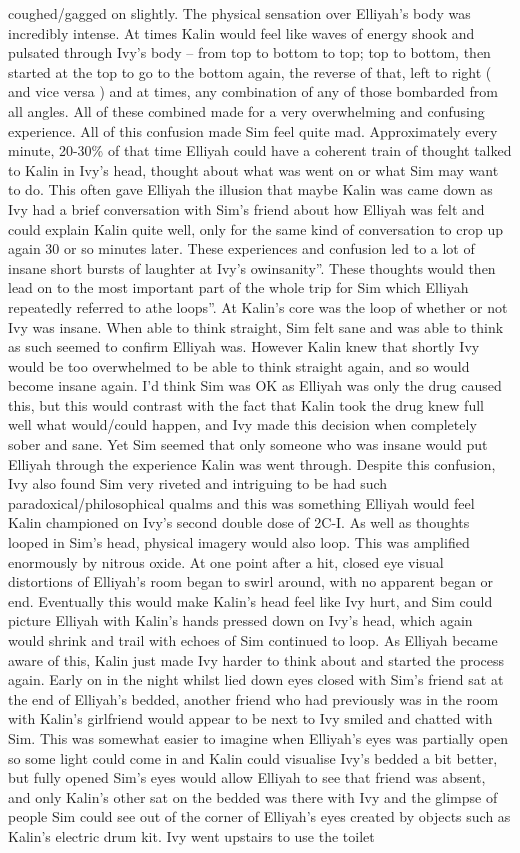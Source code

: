 \documentclass[12pt]{book}
\begin{document}
coughed/gagged on slightly. The physical sensation over Elliyah's body was incredibly intense. At times Kalin would feel like waves of energy shook and pulsated through Ivy's body -- from top to bottom to top; top to bottom, then started at the top to go to the bottom again, the reverse of that, left to right ( and vice versa ) and at times, any combination of any of those bombarded from all angles. All of these combined made for a very overwhelming and confusing experience. All of this confusion made Sim feel quite mad. Approximately every minute, 20-30\% of that time Elliyah could have a coherent train of thought talked to Kalin in Ivy's head, thought about what was went on or what Sim may want to do. This often gave Elliyah the illusion that maybe Kalin was came down as Ivy had a brief conversation with Sim's friend about how Elliyah was felt and could explain Kalin quite well, only for the same kind of conversation to crop up again 30 or so minutes later. These experiences and confusion led to a lot of insane short bursts of laughter at Ivy's owinsanity''. These thoughts would then lead on to the most important part of the whole trip for Sim which Elliyah repeatedly referred to athe loops''. At Kalin's core was the loop of whether or not Ivy was insane. When able to think straight, Sim felt sane and was able to think as such seemed to confirm Elliyah was. However Kalin knew that shortly Ivy would be too overwhelmed to be able to think straight again, and so would become insane again. I'd think Sim was OK as Elliyah was only the drug caused this, but this would contrast with the fact that Kalin took the drug knew full well what would/could happen, and Ivy made this decision when completely sober and sane. Yet Sim seemed that only someone who was insane would put Elliyah through the experience Kalin was went through. Despite this confusion, Ivy also found Sim very riveted and intriguing to be had such paradoxical/philosophical qualms and this was something Elliyah would feel Kalin championed on Ivy's second double dose of 2C-I. As well as thoughts looped in Sim's head, physical imagery would also loop. This was amplified enormously by nitrous oxide. At one point after a hit, closed eye visual distortions of Elliyah's room began to swirl around, with no apparent began or end. Eventually this would make Kalin's head feel like Ivy hurt, and Sim could picture Elliyah with Kalin's hands pressed down on Ivy's head, which again would shrink and trail with echoes of Sim continued to loop. As Elliyah became aware of this, Kalin just made Ivy harder to think about and started the process again. Early on in the night whilst lied down eyes closed with Sim's friend sat at the end of Elliyah's bedded, another friend who had previously was in the room with Kalin's girlfriend would appear to be next to Ivy smiled and chatted with Sim. This was somewhat easier to imagine when Elliyah's eyes was partially open so some light could come in and Kalin could visualise Ivy's bedded a bit better, but fully opened Sim's eyes would allow Elliyah to see that friend was absent, and only Kalin's other sat on the bedded was there with Ivy and the glimpse of people Sim could see out of the corner of Elliyah's eyes created by objects such as Kalin's electric drum kit. Ivy went upstairs to use the toilet 
\end{document}
